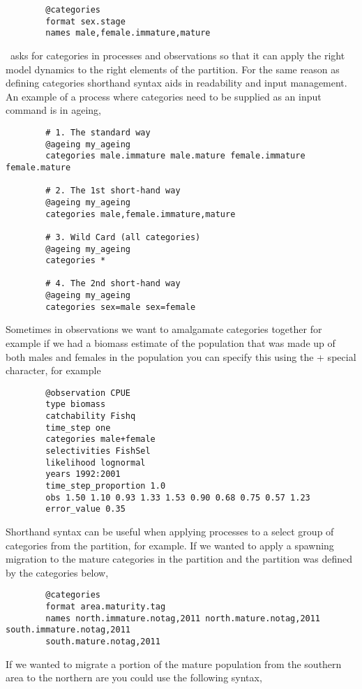{\small{\begin{verbatim}
		@categories 
		format sex.stage
		names male,female.immature,mature	
		\end{verbatim}}}

\CNAME\ asks for categories in processes and observations so that it can apply the right model dynamics to the right elements of the partition. For the same reason as defining categories shorthand syntax aids in readability and input management. An example of a process where categories need to be supplied as an input command is in ageing,

{\small{\begin{verbatim}
		# 1. The standard way
		@ageing my_ageing
		categories male.immature male.mature female.immature female.mature
		
		# 2. The 1st short-hand way
		@ageing my_ageing
		categories male,female.immature,mature
		
		# 3. Wild Card (all categories)
		@ageing my_ageing
		categories *
		
		# 4. The 2nd short-hand way
		@ageing my_ageing
		categories sex=male sex=female
		\end{verbatim}}}

Sometimes in observations we want to amalgamate categories together for example if we had a biomass estimate of the population that was made up of both males and females in the population you can specify this using the + special character, for example

{\small{\begin{verbatim}
		@observation CPUE
		type biomass
		catchability Fishq
		time_step one
		categories male+female
		selectivities FishSel
		likelihood lognormal
		years 1992:2001
		time_step_proportion 1.0
		obs 1.50 1.10 0.93 1.33 1.53 0.90 0.68 0.75 0.57 1.23
		error_value 0.35
		\end{verbatim}}}

Shorthand syntax can be useful when applying processes to a select group of categories from the partition, for example. If we wanted to apply a spawning migration to the mature categories in the partition and the partition was defined by the categories below,
{\small{\begin{verbatim}
		@categories 
		format area.maturity.tag
		names north.immature.notag,2011 north.mature.notag,2011 south.immature.notag,2011
		south.mature.notag,2011		
		\end{verbatim}}}	

If we wanted to migrate a portion of the mature population from the southern area to the northern are you could use the following syntax,

